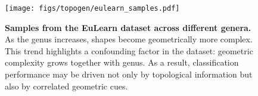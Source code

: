 \begin{figure}[t]
  \centering
  \texttt{[image: figs/topogen/eulearn\_samples.pdf]}
   \caption{\textbf{Samples from the EuLearn dataset across different genera.} As the genus increases, shapes become geometrically more complex. This trend highlights a confounding factor in the dataset: geometric complexity grows together with genus. As a result, classification performance may be driven not only by topological information but also by correlated geometric cues.}
   \label{fig:eulearn-samples}
\end{figure}








